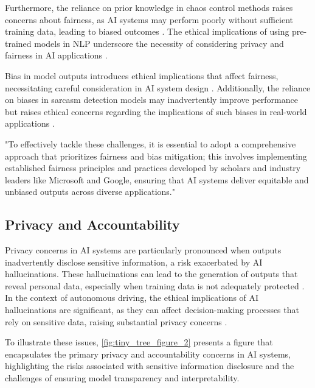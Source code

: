 Furthermore, the reliance on prior knowledge in chaos control methods raises concerns about fairness, as AI systems may perform poorly without sufficient training data, leading to biased outcomes \cite{shakarian2022reasoningcomplexnetworkslogic}. The ethical implications of using pre-trained models in NLP underscore the necessity of considering privacy and fairness in AI applications \cite{brandao2020fairnavigationplanninghumanitarian}. 



Bias in model outputs introduces ethical implications that affect fairness, necessitating careful consideration in AI system design \cite{narayanan2023democratizecareneedfairness}. Additionally, the reliance on biases in sarcasm detection models may inadvertently improve performance but raises ethical concerns regarding the implications of such biases in real-world applications \cite{le2019evolvingselfsupervisedneuralnetworks}. 



"To effectively tackle these challenges, it is essential to adopt a comprehensive approach that prioritizes fairness and bias mitigation; this involves implementing established fairness principles and practices developed by scholars and industry leaders like Microsoft and Google, ensuring that AI systems deliver equitable and unbiased outputs across diverse applications." \cite{magee2021intersectionalbiascausallanguage}



\subsection{Privacy and Accountability} \label{subsec:Privacy and Accountability}

Privacy concerns in AI systems are particularly pronounced when outputs inadvertently disclose sensitive information, a risk exacerbated by AI hallucinations. These hallucinations can lead to the generation of outputs that reveal personal data, especially when training data is not adequately protected \cite{ghazi2021deeplearninglabeldifferential}. In the context of autonomous driving, the ethical implications of AI hallucinations are significant, as they can affect decision-making processes that rely on sensitive data, raising substantial privacy concerns \cite{albrecht2021interpretablegoalbasedpredictionplanning}. 

To illustrate these issues, \autoref{fig:tiny_tree_figure_2} presents a figure that encapsulates the primary privacy and accountability concerns in AI systems, highlighting the risks associated with sensitive information disclosure and the challenges of ensuring model transparency and interpretability.

